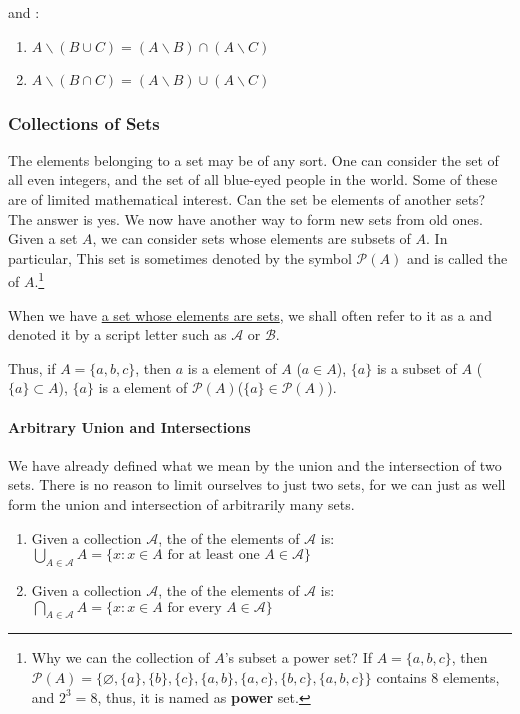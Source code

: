 and \textbf{}:
\begin{enumerate}[itemsep=0pt,topsep=0pt]
    \item $A \backslash (B\cup C) = (A \backslash B) \cap (A \backslash C)$
    \item $A \backslash (B\cap C) = (A \backslash B) \cup (A \backslash C)$
\end{enumerate}

\subsubsection{Collections of Sets}\label{sec:collections_of_sets}

The elements belonging to a set may be of any sort. One can consider the set of all even integers, and the set of all blue-eyed people in the world. Some of these are of limited mathematical interest. Can the set be elements of another sets? The answer is yes. We now have another way to form new sets from old ones. Given a set $A$, we can consider sets whose elements are subsets of $A$. In particular,  This set is sometimes denoted by the symbol $\mathcal{P}(A)$ and is called the \textbf{} of $A$.\footnote{Why we can the collection of $A$'s subset a power set? If $A= \{a, b, c\}$, then $\mathcal{P}(A) = \{\varnothing, \{a\}, \{b\}, \{c\}, \{a, b\}, \{a, c\}, \{b, c\}, \{a, b, c\}\}$ contains $8$ elements, and $2^3 = 8$, thus, it is named as \textbf{power} set.}

When we have \uline{a set whose elements are sets}, we shall often refer to it as a \textbf{} and denoted it by a script letter such as $\mathcal{A}$ or $\mathcal{B}$. 

Thus, if $A = \{a, b, c\}$, then $a$ is a element of $A$ ($a \in A$), $\{a\}$ is a subset of $A$ ($\{a\} \subset A$), $\{a\}$ is a element of $\mathcal{P}(A)$($\{a\} \in \mathcal{P}(A)$).

\paragraph{Arbitrary Union and Intersections} We have already defined what we mean by the union and the intersection of two sets. There is no reason to limit ourselves to just two sets, for we can just as well form the union and intersection of arbitrarily many sets.

\begin{enumerate}[itemsep=0pt]
    \item Given a collection $\mathcal{A}$, the \textbf{} of the elements of $\mathcal{A}$ is: $\bigcup_{A \in \mathcal{A}} A = \{x: x \in A \text{ for at least one } A \in \mathcal{A}\}$
    \item Given a collection $\mathcal{A}$, the \textbf{} of the elements of $\mathcal{A}$ is: $\bigcap_{A \in \mathcal{A}} A = \{x: x \in A \text{ for every } A \in \mathcal{A}\}$
\end{enumerate}

